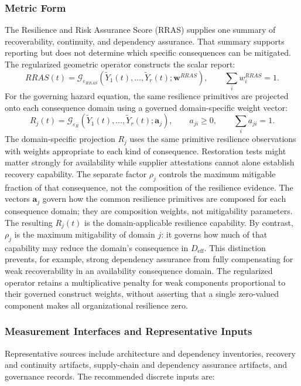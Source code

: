 \documentclass[11pt]{article}
\begin{document}
\subsubsection{Metric Form}
The Resilience and Risk Assurance Score (RRAS) supplies one
summary of recoverability, continuity, and dependency assurance.
That summary supports reporting but does not determine which
specific consequences can be mitigated. The regularized geometric
operator constructs the scalar report:
\begin{equation}
  RRAS(t)=
  \mathcal{G}_{\varepsilon_{RRAS}}
  \left(\widetilde{Y}_1(t),\ldots,\widetilde{Y}_r(t);\mathbf{w}^{RRAS}\right),
  \qquad \sum_i w_i^{RRAS}=1.
\end{equation}
For the governing hazard equation, the same resilience primitives are projected onto
each consequence domain using a governed domain-specific weight vector:
\begin{equation}
  R_j(t)=
  \mathcal{G}_{\varepsilon_R}
  \left(\widetilde{Y}_1(t),\ldots,\widetilde{Y}_r(t);\mathbf{a}_j\right),
  \qquad a_{ji}\geq0,\qquad \sum_i a_{ji}=1.
  \label{eq:domain-resilience}
\end{equation}
The domain-specific projection $R_j$ uses the same primitive resilience
observations with weights appropriate to each kind of consequence.
Restoration tests might matter strongly for availability while
supplier attestations cannot alone establish recovery capability.
The separate factor $\rho_j$ controls the maximum mitigable fraction
of that consequence, not the composition of the resilience evidence.
The vectors $\mathbf{a}_j$ govern how the common resilience primitives are composed for
each consequence domain; they are composition weights, not mitigability parameters.
The resulting $R_j(t)$ is the domain-applicable resilience capability. By contrast,
$\rho_j$ is the maximum mitigability of domain $j$: it governs how much of that
capability may reduce the domain's consequence in $D_{\mathrm{eff}}$. This distinction
prevents, for example, strong dependency assurance from fully compensating for weak
recoverability in an availability consequence domain. The regularized operator retains
a multiplicative penalty for weak components proportional to their governed construct
weights, without asserting that a single zero-valued component makes all organizational
resilience zero.

\subsubsection{Measurement Interfaces and Representative Inputs}
Representative sources include architecture and dependency inventories, recovery and
continuity artifacts, supply-chain and dependency assurance artifacts, and governance
records. The recommended discrete inputs are:
\end{document}
